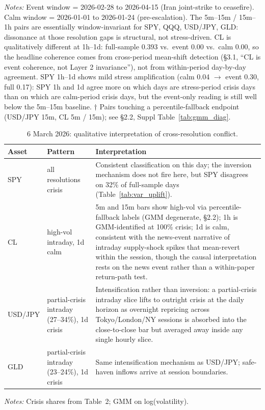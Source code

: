 \documentclass[preprint,12pt,authoryear]{elsarticle}
\newcommand{\SPY}{SPY}
\newcommand{\USDJPY}{USD/JPY}
\begin{document}
\begin{table}[!htbp]
\begin{tabular}{llcccc}
\bottomrule
\end{tabular}
\par\medskip
{\footnotesize\justifying
\textit{Notes:} Event window = 2026-02-28 to 2026-04-15 (Iran joint-strike to ceasefire). Calm window = 2026-01-01 to 2026-01-24 (pre-escalation). The 5m--15m / 15m--1h pairs are essentially window-invariant for SPY, QQQ, USD/JPY, GLD: dissonance at those resolution gaps is structural, not stress-driven. CL is qualitatively different at 1h--1d: full-sample 0.393 vs.\ event 0.00 vs.\ calm 0.00, so the headline coherence comes from cross-period mean-shift detection (\S{}3.1, ``CL is event coherence, not Layer 2 invariance''), not from within-period day-by-day agreement. SPY 1h--1d shows mild stress amplification (calm 0.04 $\to$ event 0.30, full 0.17): SPY 1h and 1d agree more on which days are stress-period crisis days than on which are calm-period crisis days, but the event-only reading is still well below the 5m--15m baseline. $\dagger$ Pairs touching a percentile-fallback endpoint (USD/JPY 15m, CL 5m / 15m); see \S{}2.2, Suppl Table~\ref{tab:gmm_diag}.
\par}
\end{table}

\begin{table}[!htbp]
\centering
\small
\setlength{\tabcolsep}{4pt}
\caption{6 March 2026: qualitative interpretation of cross-resolution conflict.}
\label{tab:mar06_conflict}
\begin{tabular}{lp{3.5cm}p{7.5cm}}
\toprule
Asset & Pattern & Interpretation \\
\midrule
SPY & all resolutions crisis & Consistent classification on this day; the inversion mechanism does not fire here, but \SPY{} disagrees on 32\% of full-sample days (Table~\ref{tab:var_uplift}). \\
CL & high-vol intraday, 1d calm & 5m and 15m bars show high-vol via percentile-fallback labels (GMM degenerate, \S{}2.2); 1h is GMM-identified at 100\% crisis; 1d is calm, consistent with the news-event narrative of intraday supply-shock spikes that mean-revert within the session, though the causal interpretation rests on the news event rather than a within-paper return-path test. \\
USD/JPY & partial-crisis intraday (27--34\%), 1d crisis & Intensification rather than inversion: a partial-crisis intraday slice lifts to outright crisis at the daily horizon as overnight repricing across Tokyo/London/NY sessions is absorbed into the close-to-close bar but averaged away inside any single hourly slice. \\
GLD & partial-crisis intraday (23--24\%), 1d crisis & Same intensification mechanism as \USDJPY{}; safe-haven inflows arrive at session boundaries. \\
\bottomrule
\end{tabular}
\par\medskip
{\footnotesize\justifying
\textit{Notes:} Crisis shares from Table~2; GMM on log(volatility).
\par}
\end{table}
\end{document}
